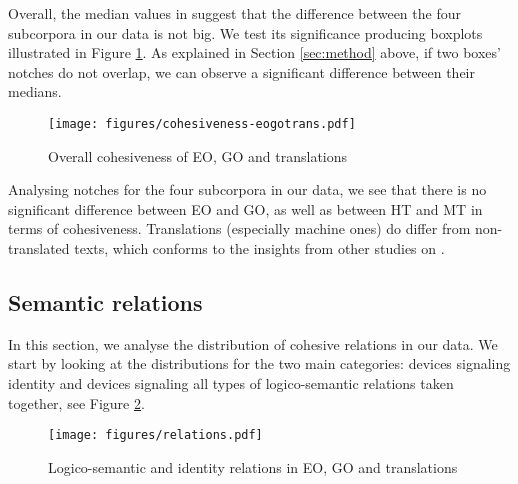 \documentclass[output=paper]{langsci/langscibook.cls}
\begin{document}
Overall, the median values in  suggest that the difference between the four subcorpora in our data is not big. We test its significance producing boxplots illustrated in Figure \ref{fig:eogo}. As explained in Section \ref{sec:method} above, if two boxes’ notches do not overlap, we can observe a significant difference between their medians. 

\begin{figure}

\texttt{[image: figures/cohesiveness-eogotrans.pdf]}
\caption{Overall cohesiveness of EO, GO and translations}
\label{fig:eogo}
\end{figure}

\newpage 
Analysing notches for the four subcorpora in our data, we see that there is no significant difference between EO and GO, as well as between HT and MT in terms of cohesiveness. Translations (especially machine ones) do differ from non-translated texts, which conforms to the insights from other studies on .  


%


\subsection{Semantic relations}\label{section:relations}

In this section, we analyse the distribution of cohesive relations in our data. We start by looking at the distributions for the two main categories: devices signaling identity and devices signaling all types of logico-semantic relations taken together, see Figure \ref{fig:relations}. %

\begin{figure}

\texttt{[image: figures/relations.pdf]}
\caption{Logico-semantic and identity relations in EO, GO and translations}
\label{fig:relations}
\end{figure}
\end{document}
